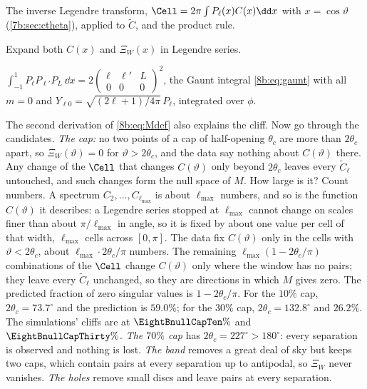 \begin{explain}
  \item The inverse Legendre transform, $\Cell=2\pi\int P_\ell(x)C(x)\dd x$ with $x=\cos\vartheta$ (\cref{7b:sec:ctheta}),
        applied to $\widetilde C$, and the product rule.
  \item Expand both $C(x)$ and $\Xi_W(x)$ in Legendre series.
  \item $\int_{-1}^1P_\ell P_{\ell'}P_L\,\dd x=2\begin{pmatrix}\ell&\ell'&L\\0&0&0\end{pmatrix}^2$, the Gaunt integral
        \eqref{8b:eq:gaunt} with all $m=0$ and $Y_{\ell0}=\sqrt{(2\ell+1)/4\pi}\,P_\ell$, integrated over $\phi$.
\end{explain}
The second derivation of \eqref{8b:eq:Mdef} also explains the cliff. Now go through the candidates.
\emph{The cap:} no two points of a cap of half-opening $\theta_c$ are more than $2\theta_c$ apart, so
$\Xi_W(\vartheta)=0$ for $\vartheta>2\theta_c$, and the data say nothing about $C(\vartheta)$ there. Any change of the
$\Cell$ that changes $C(\vartheta)$ only beyond $2\theta_c$ leaves every $\widetilde C_\ell$ untouched, and such changes form
the null space of $M$. How large is it? Count numbers. A spectrum $C_2,\dots,C_{\ell_{\max}}$ is about
$\ell_{\max}$ numbers, and so is the function $C(\vartheta)$ it describes: a Legendre series stopped at $\ell_{\max}$
cannot change on scales finer than about $\pi/\ell_{\max}$ in angle, so it is fixed by about one value per
cell of that width, $\ell_{\max}$ cells across $[0,\pi]$. The data fix $C(\vartheta)$ only in the cells with
$\vartheta<2\theta_c$, about $\ell_{\max}\cdot2\theta_c/\pi$ numbers. The remaining $\ell_{\max}(1-2\theta_c/\pi)$ combinations of the
$\Cell$ change $C(\vartheta)$ only where the window has no pairs; they leave every $\widetilde C_\ell$ unchanged, so
they are directions in which $M$ gives zero. The predicted fraction of zero singular values is
$1-2\theta_c/\pi$. For the $10\%$ cap, $2\theta_c=73.7^\circ$ and the prediction is $59.0\%$; for the
$30\%$ cap, $2\theta_c=132.8^\circ$ and $26.2\%$. The simulations' cliffs are at $\EightBnullCapTen\%$ and
$\EightBnullCapThirty\%$. \emph{The $70\%$ cap} has $2\theta_c=227^\circ>180^\circ$: every separation is observed and
nothing is lost. \emph{The band} removes a great deal of sky but keeps two caps, which contain pairs
at every separation up to antipodal, so $\Xi_W$ never vanishes. \emph{The holes} remove small discs and
leave pairs at every separation.

